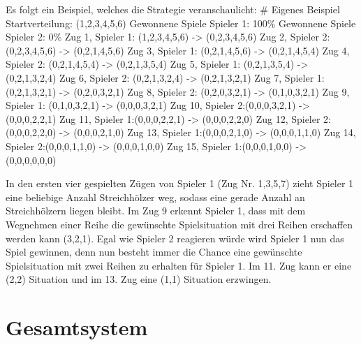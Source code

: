 Es folgt ein Beispiel, welches die Strategie veranschaulicht: \newline
\# Eigenes Beispiel \newline
Startverteilung: (1,2,3,4,5,6) \newline
Gewonnene Spiele Spieler 1: 100\% \newline
Gewonnene Spiele Spieler 2: 0\% \newline
Zug 1, Spieler 1: (1,2,3,4,5,6) -> (0,2,3,4,5,6) \newline
Zug 2, Spieler 2: (0,2,3,4,5,6) -> (0,2,1,4,5,6) \newline
Zug 3, Spieler 1: (0,2,1,4,5,6) -> (0,2,1,4,5,4) \newline
Zug 4, Spieler 2: (0,2,1,4,5,4) -> (0,2,1,3,5,4) \newline
Zug 5, Spieler 1: (0,2,1,3,5,4) -> (0,2,1,3,2,4) \newline
Zug 6, Spieler 2: (0,2,1,3,2,4) -> (0,2,1,3,2,1) \newline
Zug 7, Spieler 1: (0,2,1,3,2,1) -> (0,2,0,3,2,1) \newline
Zug 8, Spieler 2: (0,2,0,3,2,1) -> (0,1,0,3,2,1) \newline
Zug 9, Spieler 1: (0,1,0,3,2,1) -> (0,0,0,3,2,1) \newline
Zug 10, Spieler 2:(0,0,0,3,2,1) -> (0,0,0,2,2,1) \newline
Zug 11, Spieler 1:(0,0,0,2,2,1) -> (0,0,0,2,2,0) \newline
Zug 12, Spieler 2:(0,0,0,2,2,0) -> (0,0,0,2,1,0) \newline
Zug 13, Spieler 1:(0,0,0,2,1,0) -> (0,0,0,1,1,0) \newline
Zug 14, Spieler 2:(0,0,0,1,1,0) -> (0,0,0,1,0,0) \newline
Zug 15, Spieler 1:(0,0,0,1,0,0) -> (0,0,0,0,0,0) \newline

In den ersten vier gespielten Zügen von Spieler 1 (Zug Nr. 1,3,5,7) zieht Spieler 1 eine beliebige Anzahl Streichhölzer weg, sodass eine gerade Anzahl an Streichhölzern liegen bleibt. Im Zug 9 erkennt Spieler 1, dass mit dem Wegnehmen einer Reihe die gewünschte Spielsituation mit drei Reihen erschaffen werden kann (3,2,1). Egal wie Spieler 2 reagieren würde wird Spieler 1 nun das Spiel gewinnen, denn nun besteht immer die Chance eine gewünschte Spielsituation mit zwei Reihen zu erhalten für Spieler 1. Im 11. Zug kann er eine (2,2) Situation und im 13. Zug eine (1,1) Situation erzwingen. 


\section{Gesamtsystem}

